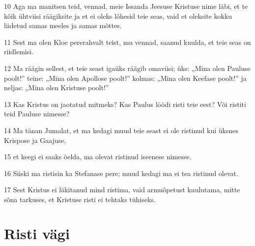 \par 10 Aga ma manitsen teid, vennad, meie Issanda Jeesuse Kristuse nime läbi, et te kõik ühtviisi räägiksite ja et ei oleks lõhesid teie seas, vaid et oleksite kokku liidetud samas meeles ja samas mõttes.
\par 11 Sest ma olen Kloe pererahvalt teist, mu vennad, saanud kuulda, et teie seas on riidlemisi.
\par 12 Ma räägin sellest, et teie seast igaüks räägib omaviisi; üks: „Mina olen Pauluse poolt!” teine: „Mina olen Apollose poolt!” kolmas: „Mina olen Keefase poolt!” ja neljas: „Mina olen Kristuse poolt!”
\par 13 Kas Kristus on jaotatud mitmeks? Kas Paulus löödi risti teie eest? Või ristiti teid Pauluse nimesse?
\par 14 Ma tänan Jumalat, et ma kedagi muud teie seast ei ole ristinud kui üksnes Krispose ja Gaajuse,
\par 15 et keegi ei saaks öelda, ma olevat ristinud iseenese nimesse.
\par 16 Siiski ma ristisin ka Stefanase pere; muud kedagi ma ei tea ristinud olevat.
\par 17 Sest Kristus ei läkitanud mind ristima, vaid armuõpetust kuulutama, mitte sõna tarkuses, et Kristuse risti ei tehtaks tühiseks.

\section*{Risti vägi}

